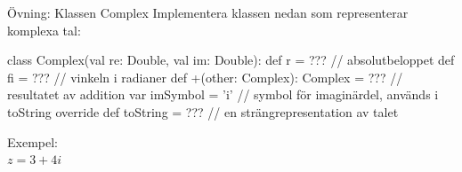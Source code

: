 




\begin{Slide}{Övning: Klassen Complex}\SlideFontSmall
Implementera klassen  nedan som representerar komplexa tal:
\begin{Code}
  class Complex(val re: Double, val im: Double):
    def r  = ???  // absolutbeloppet
    def fi = ???  // vinkeln i radianer
    def +(other: Complex): Complex = ???  // resultatet av addition
    var imSymbol = 'i'  // symbol för imaginärdel, används i toString
    override def toString = ???  // en strängrepresentation av talet
\end{Code}

\begin{minipage}{0.3\textwidth}
  Exempel: \\$z = 3 + 4i$
\end{minipage}
\begin{minipage}{0.5\textwidth}
\end{minipage}

\end{Slide}


